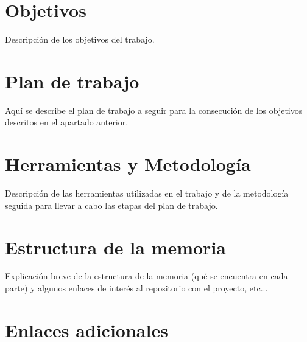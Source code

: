 \section{Objetivos}
Descripción de los objetivos del trabajo.

\section{Plan de trabajo}
Aquí se describe el plan de trabajo a seguir para la consecución de los objetivos descritos en el apartado anterior.

\section{Herramientas y Metodología}
Descripción de las herramientas utilizadas en el trabajo y de la metodología seguida para llevar a cabo las etapas del plan de trabajo.

\section{Estructura de la memoria} 
Explicación breve de la estructura de la memoria (qué se encuentra en cada parte) y algunos enlaces de interés al repositorio con el proyecto, etc...

\section{Enlaces adicionales}